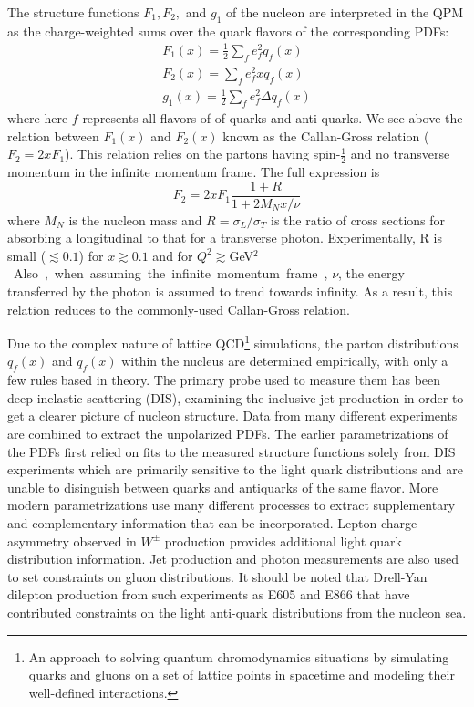 The structure functions $F_1, F_2,$ and $g_1$ of the nucleon are interpreted in the QPM as the charge-weighted sums over the quark flavors of the corresponding PDFs:
\begin{eqnarray}
F_1(x) = \frac{1}{2} \sum\limits_f e_f^2 q_f(x) \\
F_2(x) = \sum\limits_f e_f^2 x q_f(x) \label{eq:callan-gross} \\
g_1(x) = \frac{1}{2} \sum\limits_f e_f^2 \Delta q_f(x)
\end{eqnarray}
where here $f$ represents all flavors of of quarks and anti-quarks. We see above the relation between $F_1(x)$ and $F_2(x)$ known as the Callan-Gross relation ($F_2 = 2xF_1$). This relation relies on the partons having spin-$\frac{1}{2}$ and no transverse momentum in the infinite momentum frame. The full expression is
\begin{equation}
F_2 = 2xF_1 \frac{1 + R}{1 + 2 M_N x/\nu}
\end{equation}
where $M_N$ is the nucleon mass and $R=\sigma_L/\sigma_T$ is the ratio of cross sections for absorbing a longitudinal to that for a transverse photon. Experimentally, R is small\cite{PhysRevLett.61.1061} ($\lesssim0.1$) for $x\gtrsim0.1$ and for $Q^2\gtrsim$\unit[5]{GeV$^2$}. Also, when assuming the infinite momentum frame, $\nu$, the energy transferred by the photon is assumed to trend towards infinity. As a result, this relation reduces to the commonly-used Callan-Gross relation.

Due to the complex nature of lattice QCD\footnote{An approach to solving quantum chromodynamics situations by simulating quarks and gluons on a set of lattice points in spacetime and modeling their well-defined interactions.} simulations, the parton distributions $q_f(x)$ and $\bar{q}_f(x)$ within the nucleus are determined empirically, with only a few rules based in theory. The primary probe used to measure them has been deep inelastic scattering (DIS), examining the inclusive jet production in order to get a clearer picture of nucleon structure. Data from many different experiments are combined  to extract the unpolarized PDFs. The earlier parametrizations of the PDFs first relied on fits to the measured structure functions solely from DIS experiments which are primarily sensitive to the light quark distributions and are unable to disinguish between quarks and antiquarks of the same flavor. More modern parametrizations use many different processes to extract supplementary and complementary information that can be incorporated. Lepton-charge asymmetry observed in $W^\pm$ production provides additional light quark distribution information. Jet production and photon measurements are also used to set constraints on gluon distributions. It should be noted that Drell-Yan dilepton production from such experiments as E605 and E866 that have contributed constraints on the light anti-quark distributions from the nucleon sea.

